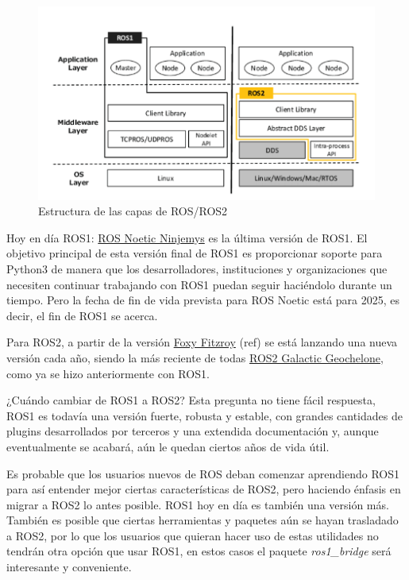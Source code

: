 \begin{figure}[H]
	\centering
	\includegraphics[scale=0.75]{imagenes/Estructura.png}
	\caption{\label{fig:ObjetivosTema1}Estructura de las capas de ROS/ROS2}
\end{figure}

Hoy en día ROS1: \href{http://wiki.ros.org/noetic}{ROS Noetic Ninjemys} es la última versión de ROS1. El objetivo principal de esta versión final de ROS1 es proporcionar soporte para Python3 de manera que los desarrolladores, instituciones y organizaciones que necesiten continuar trabajando con ROS1 puedan seguir haciéndolo durante un tiempo. Pero la fecha de fin de vida prevista para ROS Noetic está para 2025, es decir, el fin de ROS1 se acerca.

Para ROS2, a partir de la versión \href{https://docs.ros.org/en/foxy/Releases/Release-Foxy-Fitzroy.html}{Foxy Fitzroy} (ref) se está lanzando una nueva versión cada año, siendo la más reciente de todas \href{https://docs.ros.org/en/foxy/Releases/Release-Galactic-Geochelone.html}{ROS2 Galactic Geochelone}, como ya se hizo anteriormente con ROS1.

¿Cuándo cambiar de ROS1 a ROS2? Esta pregunta no tiene fácil respuesta, ROS1 es todavía una versión fuerte, robusta y estable, con grandes cantidades de plugins desarrollados por terceros y una extendida documentación y, aunque eventualmente se acabará, aún le quedan ciertos años de vida útil.

Es probable que los usuarios nuevos de ROS deban comenzar aprendiendo ROS1 para así entender mejor ciertas características de ROS2, pero haciendo énfasis en migrar a ROS2 lo antes posible. ROS1 hoy en día es también una versión más. También es posible que ciertas herramientas y paquetes aún se hayan trasladado a ROS2, por lo que los usuarios que quieran hacer uso de estas utilidades no tendrán otra opción que usar ROS1, en estos casos el paquete \textit{ros1\_bridge} será interesante y conveniente.

